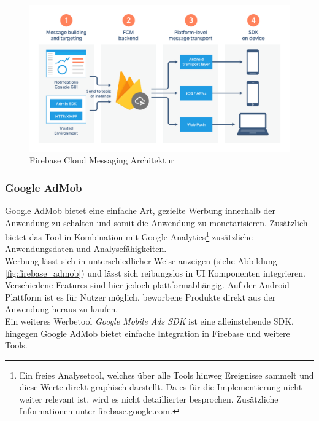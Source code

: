 \begin{figure}[htb]
	\begin{center}
		\includegraphics[scale=0.23]{images/firebase_cloudmessaging_architecture.png}
	\end{center}
	\caption{Firebase Cloud Messaging Architektur}
	\label{fig:cloudmessaging_architecture}
\end{figure}

\subsubsection{Google AdMob}
Google AdMob bietet eine einfache Art, gezielte Werbung innerhalb der Anwendung zu schalten und somit die Anwendung zu monetarisieren.
Zusätzlich bietet das Tool in Kombination mit Google Analytics\footnote{Ein freies Analysetool, welches über alle Tools hinweg Ereignisse sammelt und diese Werte direkt graphisch darstellt. Da es für die Implementierung nicht weiter relevant ist, wird es nicht detaillierter besprochen. Zusätzliche Informationen unter \href{https://firebase.google.com/docs/analytics}{firebase.google.com}.} zusätzliche Anwendungsdaten und Analysefähigkeiten.\\
Werbung lässt sich in unterschiedlicher Weise anzeigen (siehe Abbildung \ref{fig:firebase_admob}) und lässt sich reibungslos in UI Komponenten integrieren. 
Verschiedene Features sind hier jedoch plattformabhängig. 
Auf der Android Plattform ist es für Nutzer möglich, beworbene Produkte direkt aus der Anwendung heraus zu kaufen.\\
Ein weiteres Werbetool \textit{Google Mobile Ads SDK} ist eine alleinstehende SDK, hingegen Google AdMob bietet einfache Integration in Firebase und weitere Tools.\cite{firebase2021}

